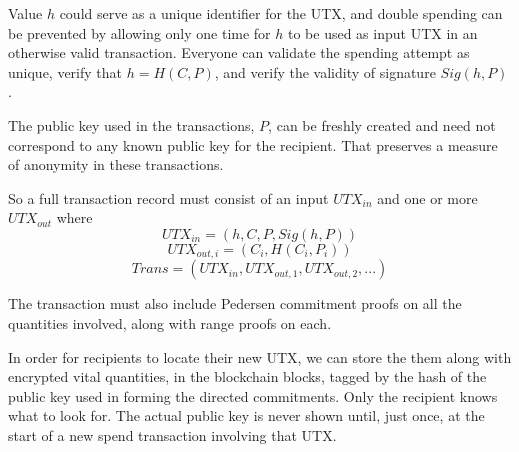 \documentclass{yellowpaper}
\begin{document}
Value $h$ could serve as a unique identifier for the UTX, and double spending can be prevented by allowing only one time for $h$ to be used as input UTX in an otherwise valid transaction. Everyone can validate the spending attempt as unique, verify that $h = H(C, P)$, and verify the validity of signature $Sig(h, P)$.

The public key used in the transactions, $P$, can be freshly created and need not correspond to any known public key for the recipient. That preserves a measure of anonymity in these transactions.

So a full transaction record must consist of an input $UTX_{in}$ and one or more $UTX_{out}$ where
$$UTX_{in} = (h, C, P, Sig(h, P))$$
$$UTX_{out, i} = (C_i, H(C_i, P_i))$$
$$Trans = (UTX_{in}, UTX_{out,1}, UTX_{out,2}, ...)$$

The transaction must also include Pedersen commitment proofs on all the quantities involved, along with range proofs on each.

In order for recipients to locate their new UTX, we can store the them along with encrypted vital quantities, in the blockchain blocks, tagged by the hash of the public key used in forming the directed commitments. Only the recipient knows what to look for. The actual public key is never shown until, just once, at the start of a new spend transaction involving that UTX.
\end{document}
